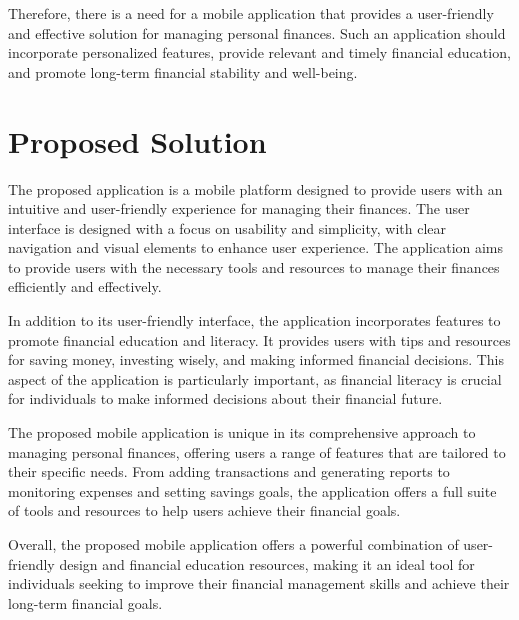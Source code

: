 \hspace{\parindent}Therefore, there is a need for a mobile application that provides a user-friendly and effective solution for managing personal finances. Such an application should incorporate personalized features, provide relevant and timely financial education, and promote long-term financial stability and well-being.
\vspace*{2mm}


\section{Proposed Solution}\label{sect:motivation}
\hspace{\parindent} The proposed application is a mobile platform designed to provide users with an intuitive and user-friendly experience for managing their finances. The user interface is designed with a focus on usability and simplicity, with clear navigation and visual elements to enhance user experience. The application aims to provide users with the necessary tools and resources to manage their finances efficiently and effectively.

\hspace{\parindent}In addition to its user-friendly interface, the application incorporates features to promote financial education and literacy. It provides users with tips and resources for saving money, investing wisely, and making informed financial decisions. This aspect of the application is particularly important, as financial literacy is crucial for individuals to make informed decisions about their financial future.

\hspace{\parindent}The proposed mobile application is unique in its comprehensive approach to managing personal finances, offering users a range of features that are tailored to their specific needs. From adding transactions and generating reports to monitoring expenses and setting savings goals, the application offers a full suite of tools and resources to help users achieve their financial goals.

\hspace{\parindent}Overall, the proposed mobile application offers a powerful combination of user-friendly design and financial education resources, making it an ideal tool for individuals seeking to improve their financial management skills and achieve their long-term financial goals.

